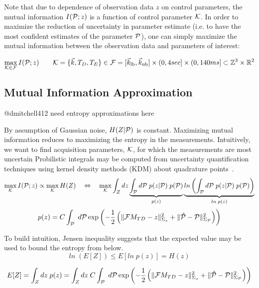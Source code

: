 \documentclass{article}         %
\theoremstyle{definition}
\theoremstyle{remark}
\begin{document}
\begin{enumerate}
Note that due to dependence of observation data $z$ on control parameters, the
mutual information $I(\mathcal{P};z)$ is a function of control parameter $\mathcal{K}$. In order
to maximize the reduction of uncertainty in parameter estimate (i.e. to have
the most confident estimates of the parameter $\mathcal{P}$), one can simply maximize
the mutual information between the observation data and parameters of interest:

\begin{equation}\label{mimax}
\max_{\mathcal{K} \in \mathcal{F}} I(\mathcal{P};z)
\qquad
\mathcal{K}=\{\vec{k},T_D,T_E\} \in \mathcal{F} = 
   [\vec{k}_\text{lb},\vec{k}_\text{ub}] \times 
   (0,4sec] \times (0,140ms] \subset  \mathbb{Z}^3 \times \mathbb{R}^2 
\end{equation}
\end{enumerate}


\subsection{Mutual Information Approximation}
{\color{red} @dmitchell412 need entropy approximations here}

By assumption of Gaussian noise, $H(Z|\mathcal{P})$ is constant.
Maximizing mutual information reduces to maximizing the entropy 
in the measurements.
Intuitively, we want to find acquisition parameters,
$\mathcal{K}$, for which the measurements are most uncertain
Probilistic integrals may be computed from uncertainty quantification
techniques using kernel density methods (KDM) about quadrature 
points~\cite{walters2009estimation,
tobin2013kernel,terejanu2012bayesian,fahrenholtz2013generalised}.
\[
\max_{\mathcal{K}} I(\mathcal{P};z)
\propto
\max_{\mathcal{K}} H(Z)
  \quad \Leftrightarrow \quad
\max_{\mathcal{K}} 
    \int_Z   dz \underbrace{\int_{\mathcal{P}}  d\mathcal{P} \; p(z|\mathcal{P}) \; p(\mathcal{P})}_{p(z)}
                \underbrace{ln \left(\int_{\mathcal{P}}  d\mathcal{P} \; p(z|\mathcal{P}) \; p(\mathcal{P})\right)}_{ln \; p(z)}
\]
\[
    p(z) = 
         C \int_{\mathcal{P}}
            \; d\mathcal{P}  
              \exp\left( - \frac{1}{2} \left(
                     \|\mathcal{F}M_{TD}  - z \|^2_{\Sigma_z}
                   + \|\hat{\mathcal{P}}  - \mathcal{P} \|^2_{\Sigma_{\mathcal{P}}}
                  \right)              \right)
\]

To build intuition, Jensen inequality suggests that the expected value
may be used to bound the entropy from below.
\[
ln \; ( E[Z] ) \leq
E[ln\; p(z)] = H(z)  
\]

\[
 E[Z] = \int_Z   dz \; p(z) 
      = \int_Z   dz  \;
         C \int_{\mathcal{P}}
            \; d\mathcal{P}  
              \exp\left( - \frac{1}{2} \left(
                     \|\mathcal{F}M_{TD}  - z \|^2_{\Sigma_z}
                   + \|\hat{\mathcal{P}}  - \mathcal{P} \|^2_{\Sigma_{\mathcal{P}}}
                  \right)              \right)
\]
\end{document}

